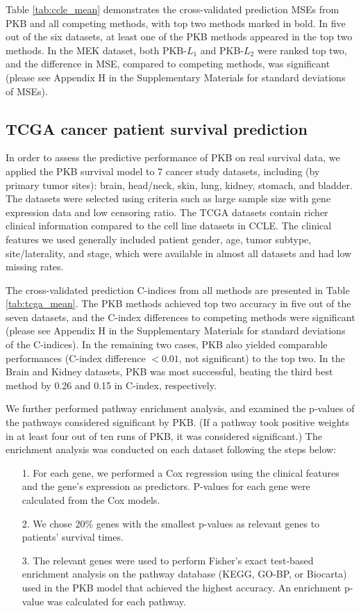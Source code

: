 \documentclass[a4paper,12pt]{article}
\begin{document}
Table \ref{tab:ccle_mean} demonstrates the cross-validated prediction MSEs from PKB and all competing methods, with top two methods marked in bold. In five out of the six datasets, at least one of the PKB methods appeared in the top two methods. In the MEK dataset, both PKB-$L_1$ and PKB-$L_2$ were ranked top two, and the difference in MSE, compared to competing methods, was significant (please see Appendix H in the Supplementary Materials for standard deviations of MSEs). 


\subsection{TCGA cancer patient survival prediction}

In order to assess the predictive performance of PKB on real survival data, we applied the PKB survival model to 7 cancer study datasets, including (by primary tumor sites): brain, head/neck, skin, lung, kidney, stomach, and bladder. The datasets were selected using criteria such as large sample size with gene expression data and low censoring ratio. The TCGA datasets contain richer clinical information compared to the cell line datasets in CCLE. The clinical features we used generally included patient gender, age, tumor subtype, site/laterality, and stage, which were available in almost all datasets and had low missing rates. 

The cross-validated prediction C-indices from all methods are presented in Table \ref{tab:tcga_mean}. The PKB methods achieved top two accuracy in five out of the seven datasets, and the C-index differences to competing methods were significant (please see Appendix H in the Supplementary Materials for standard deviations of the C-indices). In the remaining two cases, PKB also yielded comparable performances (C-index difference $< 0.01$, not significant) to the top two. In the Brain and Kidney datasets, PKB was most successful, beating the third best method by 0.26 and 0.15 in C-index, respectively.


We further performed pathway enrichment analysis, and examined the p-values of the pathways considered significant by PKB. (If a pathway took positive weights in at least four out of ten runs of PKB, it was considered significant.) The enrichment analysis was conducted on each dataset following the steps below:
\begin{itemize}
	\item[1.] For each gene, we performed a Cox regression using the clinical features and the gene's expression as predictors. P-values for each gene were calculated from the Cox models.
	\item[2.] We chose $20\%$ genes with the smallest p-values as relevant genes to patients' survival times. 
	\item[3.] The relevant genes were used to perform Fisher's exact test-based  enrichment analysis \citep{huang2008bioinformatics} on the pathway database (KEGG, GO-BP, or Biocarta) used in the PKB model that achieved the highest accuracy. An enrichment p-value was calculated for each pathway.
\end{itemize}
\end{document}
